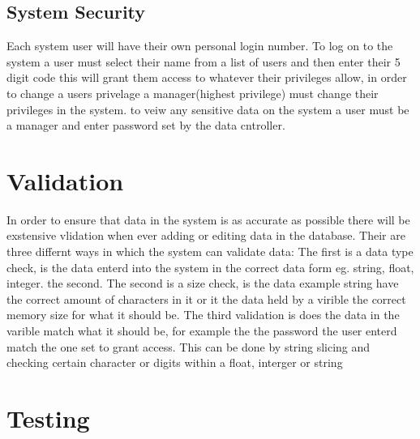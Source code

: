 \subsection{System Security}

Each system user will have their own personal login number. To log on to the system a user must select their name from a list of users and then enter their 5 digit code this will grant them access to whatever their privileges allow, in order to change a users privelage a manager(highest privilege) must change their privileges in the system. to veiw any sensitive data on the system a user must be a manager and enter password set by the data cntroller.

\section{Validation}

In order to ensure that data in the system is as accurate as possible there will be exstensive vlidation when ever adding or editing data in the database. Their are three differnt ways in which the system can validate data: The first is a data type check, is the data enterd into the system in the correct data form eg. string, float, integer. the second. The second is a size check, is the data example string have the correct amount of characters in it or it the data held by a virible the correct memory size for what it should be. The third validation is does the data in the varible match what it should be, for example the the password the user enterd match the one set to grant access. This can be done by string slicing and checking certain character or digits within a float, interger or string

\section{Testing}

